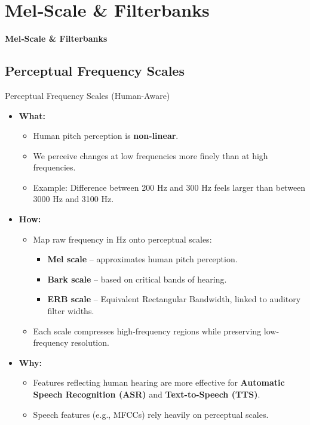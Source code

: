\section{Mel‑Scale \& Filterbanks}
\begin{frame}{}
    \LARGE \textbf{Mel‑Scale \& Filterbanks}
\end{frame}

\subsection{Perceptual Frequency Scales}
\begin{frame}[allowframebreaks]{Perceptual Frequency Scales (Human-Aware)}
    \begin{itemize}
        \item \textbf{What:}
        \begin{itemize}
            \item Human pitch perception is \textbf{non-linear}.
            \item We perceive changes at low frequencies more finely than at high frequencies.
            \item Example: Difference between 200 Hz and 300 Hz feels larger than between 3000 Hz and 3100 Hz.
        \end{itemize}
\framebreak
        \item \textbf{How:}
        \begin{itemize}
            \item Map raw frequency in Hz onto perceptual scales:
            \begin{itemize}
                \item \textbf{Mel scale} – approximates human pitch perception.
                \item \textbf{Bark scale} – based on critical bands of hearing.
                \item \textbf{ERB scale} – Equivalent Rectangular Bandwidth, linked to auditory filter widths.
            \end{itemize}
            \item Each scale compresses high-frequency regions while preserving low-frequency resolution.
        \end{itemize}
\framebreak
        \item \textbf{Why:}
        \begin{itemize}
            \item Features reflecting human hearing are more effective for \textbf{Automatic Speech Recognition (ASR)} and \textbf{Text-to-Speech (TTS)}.
            \item Speech features (e.g., MFCCs) rely heavily on perceptual scales.
        \end{itemize}


\end{itemize}
\end{frame}
